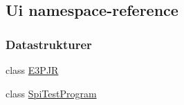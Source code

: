 \hypertarget{namespace_ui}{}\subsection{Ui namespace-\/reference}
\label{namespace_ui}
\subsubsection*{Datastrukturer}
\begin{DoxyCompactItemize}
\item 
class \hyperlink{class_ui_1_1_e3_p_j_r}{E3\+P\+JR}
\item 
class \hyperlink{class_ui_1_1_spi_test_program}{Spi\+Test\+Program}
\end{DoxyCompactItemize}
